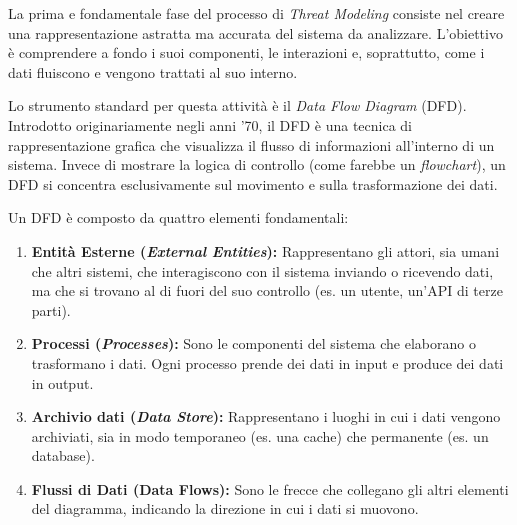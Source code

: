 

La prima e fondamentale fase del processo di \textit{Threat Modeling} consiste nel creare una rappresentazione astratta ma accurata del sistema da analizzare. L'obiettivo è comprendere a fondo i suoi componenti, le interazioni e, soprattutto, come i dati fluiscono e vengono trattati al suo interno.


Lo strumento standard per questa attività è il \textit{Data Flow Diagram} (DFD). Introdotto originariamente negli anni '70, il DFD è una tecnica di rappresentazione grafica che visualizza il flusso di informazioni all'interno di un sistema. Invece di mostrare la logica di controllo (come farebbe un \textit{flowchart}), un DFD si concentra esclusivamente sul movimento e sulla trasformazione dei dati.


Un DFD è composto da quattro elementi fondamentali:


\begin{enumerate}
    \item \textbf{Entità Esterne (\textit{External Entities}):} Rappresentano gli attori, sia umani che altri sistemi, che interagiscono con il sistema inviando o ricevendo dati, ma che si trovano al di fuori del suo controllo (es. un utente, un'API di terze parti).
    \item \textbf{Processi (\textit{Processes}):} Sono le componenti del sistema che elaborano o trasformano i dati. Ogni processo prende dei dati in input e produce dei dati in output.
    \item \textbf{Archivio dati (\textit{Data Store}):} Rappresentano i luoghi in cui i dati vengono archiviati, sia in modo temporaneo (es. una cache) che permanente (es. un database).
    \item \textbf{Flussi di Dati (Data Flows):} Sono le frecce che collegano gli altri elementi del diagramma, indicando la direzione in cui i dati si muovono.
\end{enumerate}

